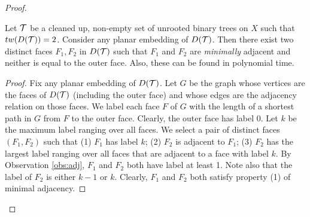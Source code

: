 \begin{proof}


\begin{lemma}
\label{lemma:inclmin}
 Let ${\mathcal T}$ be a cleaned up, non-empty set of unrooted binary trees on $X$ such that $tw(D({\mathcal T})) = 2$. Consider any planar embedding of $D({\mathcal T})$. Then there exist two distinct faces $F_1, F_2$ in $D({\mathcal T})$ such that $F_1$ and $F_2$ are \emph{minimally} adjacent and neither is equal to the outer face. Also, these can be found in polynomial time.
\end{lemma}
\begin{proof}
Fix any planar embedding of $D({\mathcal T})$. Let $G$ be the graph whose vertices are the faces of $D({\mathcal T})$ (including the outer face) and whose edges are the adjacency relation on those faces. We label each face $F$ of $G$ with the length of a shortest path in $G$ from $F$ to the outer face. Clearly, the outer face has label 0. Let $k$ be the maximum label ranging over all faces. We select a pair of distinct faces $(F_1, F_2)$ such that (1) $F_1$ has label $k$; (2) $F_2$ is adjacent to $F_1$; (3) $F_2$ has the largest label ranging over all faces that are adjacent to a face with label $k$. By Observation \ref{obs:adj}, $F_1$ and $F_2$ both have label at least 1. Note also that the label of $F_2$ is either $k-1$ or $k$. Clearly, $F_1$ and $F_2$ both satisfy property (1) of minimal adjacency. 


\end{proof}
\end{proof}
